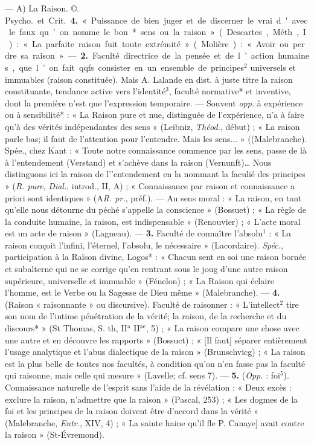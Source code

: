 \begin{itemize}[leftmargin=1cm, label=, itemsep=1pt]
 — A) La Raison. ©. \si{Psycho.}
et \si{Crit.} {\bf 4.} « Puissance de bien juger
et de discerner le vrai d'avec le
faux... qu’on nomme le bon* sens
ou la raison » (Descartes, Méth., I) :
« La parfaite raison fuit toute extrémité » (Molière): « Avoir ou perdre
sa raison ». — {\bf 2.} Faculté directrice
de la pensée et de l’action humaines,
que l’on fait qqfs. consister en un
ensemble de principes$^2$ universels
et immuables (raison constituée).
Mais A. Lalande en dist. à juste
titre la raison constituante, tendance
active vers l'identité$^3$, faculté normative* et inventive, dont la première n’est que l'expression temporaire. — Souvent {\it opp.} à expérience
ou à sensibilité* : « La Raison pure
et nue, distinguée de l'expérience,
n’a à faire qu'à des vérités indépendantes des sens » (Leibniz, {\it Théod.},
début) ; « La raison parle bas; il faut
de l'attention pour l’entendre. Mais
les sens... » ((Malebranche). Spée.,
chez Kant : « Toute notre connaissance commence par les sens, passe
de là à l’entendement (Verstand) et
s’achève dans la raison (Vernunft)…
Nous distinguons ici la raison de
l’'entendement en la nommant la
faculié des principes » ({\it R. pure},
{\it Dial.}, introd., II, A) ; « Connaissance
par raison et connaissance a priori
sont identiques » (A{\it R. pr.}, préf.). —
Au sens moral : « La raison, en tant
qu’elle nous détourne du péché
s'appelle la conscience » (Bossuet) ;
« La règle de la conduite humaine,
la raison, est indispensable » (Renouvier) ; « L'acte moral est un acte
de raison » (Lagneau). — {\bf 3.} Faculté
de connaître l'absolu$^1$ : « La raison
conçoit l'infini, l'éternel, l'absolu,
le nécessaire » (Lacordaire). {\it Spéc.},
participation à la Raïson divine,
Logos* : « Chacun sent en soi une
raison bornée et subalterne qui ne
se corrige qu'en rentrant sous le
joug d’une autre raison supérieure,
universelle et immuable » (Fénelon) ;
« La Raison qui éclaire l’homme,
est le Verbe ou la Sagesse de Dieu
même » (Malebranche). — {\bf 4.} (Raison
« raisonnante » ou discursive). Faculté de raisonner : « L’intellect$^2$
tire son nom de l’intime pénétration de la vérité; la raison, de la
recherche et du discours* » (St Thomas, S. th, II$^\text{a}$ II$^\text{ae}$, 5) ; « La raison
compare une chose avec une autre
et en découvre les rapports » (Bossuct) ; « [Il faut] séparer entièrement l’usage analytique et l’abus
dialectique de la raison » (Brunschvicg) ; « La raison est la plus belle
de toutes nos facultés, à condition
qu’on n’en fasse pas la faculté qui
raisonne, mais celle qui mesure »
(Lavelle; cf. sens 7). — {\bf 5.} ({\it Opp.} :
foi$^5$). Connaissance naturelle de
l’esprit sans l’aide de la révélation :
« Deux excès : exclure la raison,
n’admettre que la raison » (Pascal,
253) ; « Les dogmes de la foi et les
principes de la raison doivent être
d'accord dans la vérité » (Malebranche, {\it Entr.}, XIV, 4) ; « La sainte
haine qu’il fle P. Canaye] avait
contre la raison » (St-Évremond).


\end{itemize}
